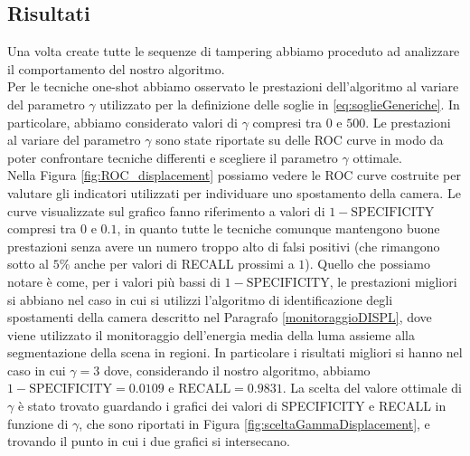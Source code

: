 \subsection{Risultati}
Una volta create tutte le sequenze di tampering abbiamo proceduto ad analizzare il comportamento del nostro algoritmo.\\
Per le tecniche one-shot abbiamo osservato le prestazioni dell'algoritmo al variare del parametro $\gamma$ utilizzato per la definizione delle soglie in \eqref{eq:soglieGeneriche}.
In particolare, abbiamo considerato valori di $\gamma$ compresi tra $0$ e $500$.
Le prestazioni al variare del parametro $\gamma$ sono state riportate su delle ROC curve in modo da poter confrontare tecniche differenti e scegliere il parametro $\gamma$ ottimale.\\ 
Nella Figura \ref{fig:ROC_displacement} possiamo vedere le ROC curve costruite per valutare gli indicatori utilizzati per individuare uno spostamento della camera.
Le curve visualizzate sul grafico fanno riferimento a valori di $1-\text{SPECIFICITY}$ compresi tra $0$ e $0.1$, in quanto tutte le tecniche comunque mantengono buone prestazioni senza avere un numero troppo alto di falsi positivi (che rimangono sotto al $5\%$ anche per valori di RECALL prossimi a $1$).
Quello che possiamo notare \`e come, per i valori pi\`u bassi di $1-\text{SPECIFICITY}$, le prestazioni migliori si abbiano nel caso in cui si utilizzi l'algoritmo di identificazione degli spostamenti della camera descritto nel Paragrafo \ref{monitoraggioDISPL}, dove viene utilizzato il monitoraggio dell'energia media della luma assieme alla segmentazione della scena in regioni.
In particolare i risultati migliori si hanno nel caso in cui $\gamma = 3$ dove, considerando il nostro algoritmo, abbiamo $1-\text{SPECIFICITY}=0.0109$ e $\text{RECALL} = 0.9831$.
La scelta del valore ottimale di $\gamma$ \`e stato trovato guardando i grafici dei valori di SPECIFICITY e RECALL in funzione di $\gamma$, che sono riportati in Figura \ref{fig:sceltaGammaDisplacement}, e trovando il punto in cui i due grafici si intersecano.\\
